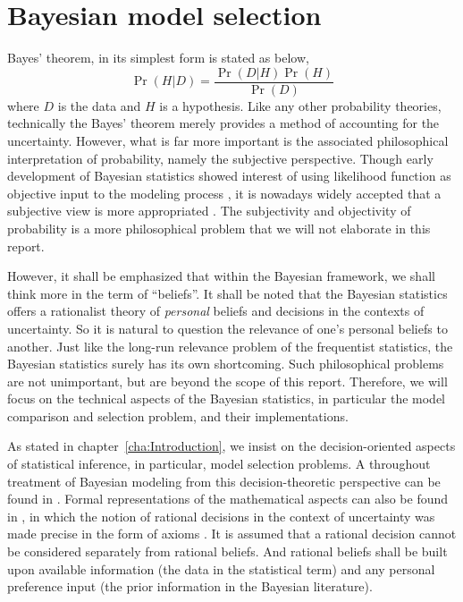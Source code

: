 \chapter{Bayesian model selection}
\label{cha:Bayesian model selection}

Bayes' theorem, in its simplest form is stated as below,
\begin{equation}
  \Pr(H|D) = \frac{\Pr(D|H)\Pr(H)}{\Pr(D)}
  \label{eq:bayes}
\end{equation}
where $D$ is the data and $H$ is a hypothesis. Like any other probability
theories, technically the Bayes' theorem merely provides a method of
accounting for the uncertainty. However, what is far more important is the
associated philosophical interpretation of probability, namely the subjective
perspective. Though early development of Bayesian statistics showed interest
of using likelihood function as objective input to the modeling process
\parencite{Jeffreys1961, Jeffreys1946}, it is nowadays widely accepted that a
subjective view is more appropriated \parencite[][chap.~1]{Bernardo2000}. The
subjectivity and objectivity of probability is a more philosophical problem
that we will not elaborate in this report.

However, it shall be emphasized that within the Bayesian framework, we shall
think more in the term of ``beliefs''. It shall be noted that the Bayesian
statistics offers a rationalist theory of \emph{personal} beliefs and
decisions in the contexts of uncertainty. So it is natural to question the
relevance of one's personal beliefs to another. Just like the long-run
relevance problem of the frequentist statistics, the Bayesian statistics
surely has its own shortcoming. Such philosophical problems are not
unimportant, but are beyond the scope of this report. Therefore, we will focus
on the technical aspects of the Bayesian statistics, in particular the model
comparison and selection problem, and their implementations.

As stated in chapter~\ref{cha:Introduction}, we insist on the
decision-oriented aspects of statistical inference, in particular, model
selection problems. A throughout treatment of Bayesian modeling from this
decision-theoretic perspective can be found in \textcite{Robert2007}. Formal
representations of the mathematical aspects can also be found in
\textcite[][sec.~5.1 and sec.~6.1]{Bernardo2000}, in which the notion of
rational decisions in the context of uncertainty was made precise in the form
of axioms \parencite[][chap.~2]{Bernardo2000}. It is assumed that a rational
decision cannot be considered separately from rational beliefs. And rational
beliefs shall be built upon available information (the data in the statistical
term) and any personal preference input (the prior information in the Bayesian
literature).

